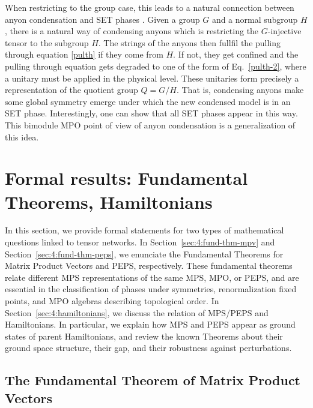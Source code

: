 \documentclass[rmp,aps,reprint,superscriptaddress,nobalancelastpage]{revtex4-1}
\begin{document}
When restricting to the group case, this leads to a natural connection between anyon condensation and SET phases  \cite{garre2017symmetry}. Given a group $G$ and a normal subgroup $H$, there is a natural way of condensing anyons which is restricting the $G$-injective tensor to the subgroup $H$. The strings of the anyons then fullfil the pulling through equation \eqref{pulth} if they come from $H$. If not, they get confined and the pulling through equation gets degraded to one of the form of Eq.~\eqref{pulth-2}, where a unitary must be applied in the physical level. These unitaries form precisely a representation of the quotient group $Q=G/H$. That is, condensing anyons make some global symmetry emerge under which the new condensed model is in an SET phase. Interestingly, one can show that all SET phases appear in this way. This bimodule MPO point of view of anyon condensation is a generalization of this idea.






\section{Formal results: Fundamental Theorems, Hamiltonians%
  \label{sec_4}\label{sec:4}}



In this section, we provide formal statements for two types of mathematical questions linked to tensor networks.  In Section~\ref{sec:4:fund-thm-mpv} and Section~\ref{sec:4:fund-thm-peps}, we enunciate the Fundamental Theorems for Matrix Product Vectors and PEPS, respectively. These fundamental theorems relate different MPS representations of the same MPS, MPO, or PEPS, and are essential in the classification of phases under symmetries, renormalization fixed points, and MPO algebras describing topological order.  In Section~\ref{sec:4:hamiltonians}, we discuss the relation of MPS/PEPS and Hamiltonians. In particular, we explain how MPS and PEPS appear as ground states of parent Hamiltonians, and review the known Theorems about their ground space structure, their gap, and their robustness against perturbations.






\subsection{The Fundamental Theorem of Matrix Product Vectors\label{Sec:MPV}\label{sec:4:fund-thm-mpv}}
\end{document}

